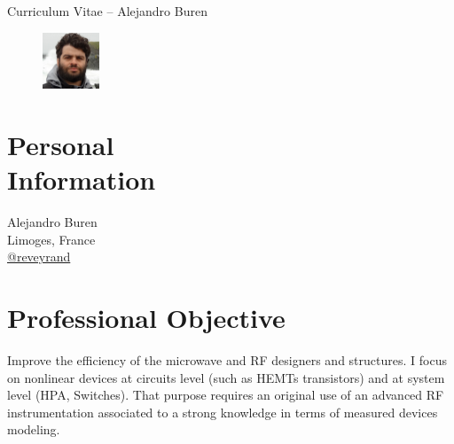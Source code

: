 \documentclass[margin,line]{resume}
\begin{document}
{\sc \Large Curriculum Vitae -- Alejandro Buren}
\begin{resume}


    \vspace{0.5cm}
    \begin{figure}
         \vspace{-0.9cm}
        \begin{center}
        \includegraphics[width=0.15\textwidth]{Buren_profile.png}
        \end{center}
         \vspace{-1cm}
    \end{figure}

 
    \section{\mysidestyle Personal\\Information}
    Alejandro Buren \\
    Limoges, France\\ 
    \faTwitter  \space \href{https://twitter.com/reveyrand/}{@reveyrand} \\
   

    \section{\mysidestyle Professional Objective}
    Improve the efficiency of the microwave and RF designers and structures. I focus on nonlinear devices at circuits level (such as HEMTs transistors) and at system level (HPA, Switches). That purpose requires an original use of an advanced RF instrumentation associated to a strong knowledge in terms of measured devices modeling.
 

\end{resume}
\end{document}
